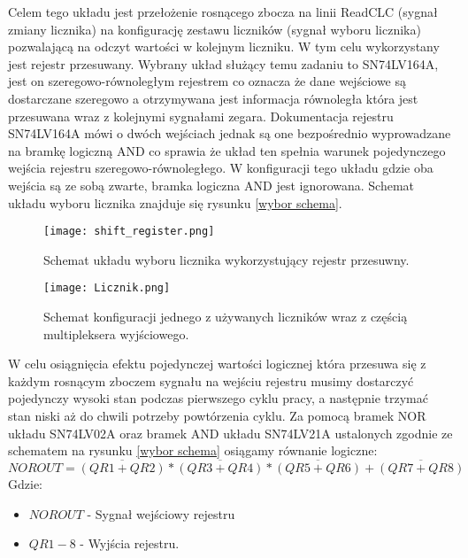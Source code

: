 Celem tego układu jest przełożenie rosnącego zbocza na linii ReadCLC (sygnał zmiany licznika) na konfigurację zestawu liczników (sygnał wyboru licznika) pozwalającą na odczyt wartości w kolejnym liczniku. W tym celu wykorzystany jest rejestr przesuwany. 
Wybrany układ służący temu zadaniu to SN74LV164A\cite{shift doc}, jest on szeregowo-równoległym rejestrem co oznacza że dane wejściowe są dostarczane szeregowo a otrzymywana jest informacja równoległa która jest przesuwana wraz z kolejnymi sygnałami zegara. Dokumentacja rejestru SN74LV164A mówi o dwóch wejściach jednak są one bezpośrednio wyprowadzane na bramkę logiczną AND co sprawia że układ ten spełnia warunek pojedynczego wejścia rejestru szeregowo-równoległego. W konfiguracji tego układu gdzie oba wejścia są ze sobą zwarte, bramka logiczna AND jest ignorowana.
Schemat układu wyboru licznika znajduje się rysunku \ref{wybor schema}. 

\begin{figure}
        \begin{multicols}{2}
                \texttt{[image: shift\_register.png]}
                \caption{Schemat układu wyboru licznika wykorzystujący rejestr przesuwny.}
                \label{wybor schema}
                \par
                \hfill
                \texttt{[image: Licznik.png]}
                \caption{Schemat konfiguracji jednego z używanych liczników wraz z częścią multipleksera wyjściowego.}
                \label{licznik}
                \par
                \hfill
        \end{multicols} 
\end{figure}

W celu osiągnięcia efektu pojedynczej wartości logicznej która przesuwa się z każdym rosnącym zboczem sygnału na wejściu rejestru musimy dostarczyć pojedynczy wysoki stan podczas pierwszego cyklu pracy, a następnie trzymać stan niski aż do chwili potrzeby powtórzenia cyklu. 
Za pomocą bramek NOR układu SN74LV02A oraz bramek AND układu SN74LV21A ustalonych zgodnie ze schematem na rysunku \ref{wybor schema} osiągamy równanie logiczne:
\begin{equation}
        NOROUT = \overline{(QR1+QR2)} * \overline{(QR3+QR4)} * \overline{(QR5+QR6)} + \overline{(QR7+QR8)}
\end{equation}
Gdzie:
\begin{itemize}
        \item $NOROUT$ - Sygnał wejściowy rejestru 
        \item $QR1-8$ - Wyjścia rejestru. 
\end{itemize}

